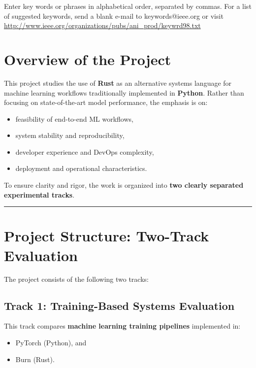 \documentclass{ieeeaccess}
\begin{document}
\begin{keywords}
Enter key words or phrases in alphabetical 
order, separated by commas. For a list of suggested keywords, send a blank 
e-mail to keywords@ieee.org or visit \underline
{http://www.ieee.org/organizations/pubs/ani\_prod/keywrd98.txt}
\end{keywords}

\titlepgskip=-15pt

\maketitle
\section{Overview of the Project}

This project studies the use of \textbf{Rust} as an alternative systems language for machine learning workflows traditionally implemented in \textbf{Python}.  
Rather than focusing on state-of-the-art model performance, the emphasis is on:

\begin{itemize}
    \item feasibility of end-to-end ML workflows,
    \item system stability and reproducibility,
    \item developer experience and DevOps complexity,
    \item deployment and operational characteristics.
\end{itemize}

To ensure clarity and rigor, the work is organized into \textbf{two clearly separated experimental tracks}.

\hrule

\section{Project Structure: Two-Track Evaluation}

The project consists of the following two tracks:

\subsection*{Track 1: Training-Based Systems Evaluation}
This track compares \textbf{machine learning training pipelines} implemented in:
\begin{itemize}
    \item PyTorch (Python), and
    \item Burn (Rust).
\end{itemize}
\end{document}
